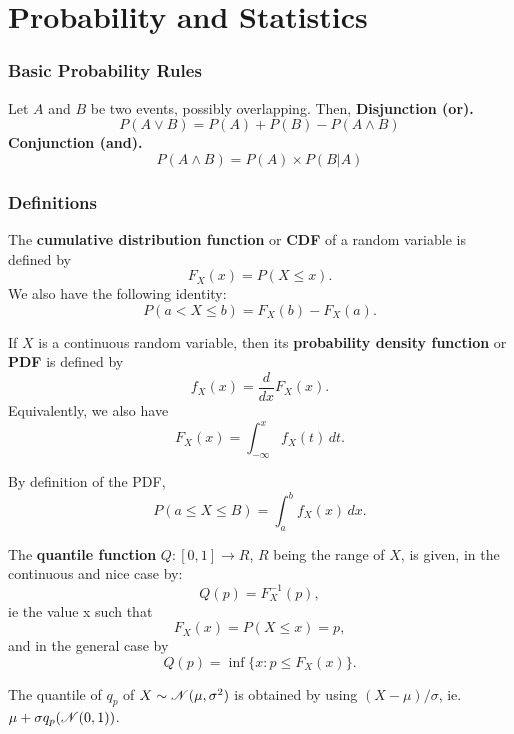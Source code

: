 \documentclass[10pt]{article}
\begin{document}
\part{Probability and Statistics}

\section{Basic Probability Rules}
\begin{outline}
Let $A$ and $B$ be two events, possibly overlapping. Then,
\1 \textbf{Disjunction (or).} 
\begin{equation*}
  P(A\vee B) = P(A) + P(B) - P(A \wedge B)
\end{equation*}
\1 \textbf{Conjunction (and).}
\begin{equation*}
  P(A\wedge B) = P(A)\times P(B|A)
\end{equation*}
\end{outline}

\section{Definitions}
\begin{outline}
\1 The \textbf{cumulative distribution function} or \textbf{CDF} of a random variable is
defined by
\begin{equation*}
  F_X(x) = P(X\leq x).
\end{equation*}
We also have the following identity:
\begin{equation*}
  P(a<X\leq b) = F_X(b) - F_X(a).
\end{equation*}

\1 If $X$ is a continuous random variable, then its \textbf{probability density function}
or \textbf{PDF} is defined by
\begin{equation*}
  f_X(x) = \frac{d}{dx}F_X(x).
\end{equation*}
Equivalently, we also have
\begin{equation*}
  F_X(x) = \int_{-\infty}^x f_X(t)\,dt.
\end{equation*}

\1 By definition of the PDF, 
\begin{equation*}
  P(a\leq X\leq B) = \int_{a}^bf_X(x)\,dx.
\end{equation*}

\1 The \textbf{quantile function} $Q:[0,1]\to R$, $R$ being the range of $X$, is given, in
the continuous and nice case by:
\begin{equation*}
  Q(p) = F_X^{-1}(p),
\end{equation*}
ie the value x such that 
\begin{equation*}
  F_X(x) = P(X\leq x) = p,
\end{equation*}
and in the general case by
\begin{equation*}
  Q(p) = \inf\{x: p\leq F_X(x)\}.
\end{equation*}

\1 The quantile of $q_p$ of $X\sim\mathscr{N}(\mu,\sigma^2)$ is obtained by using
$(X-\mu)/\sigma$, ie. $\mu + \sigma q_p(\mathscr{N}(0,1))$.

\end{outline}
\end{document}
